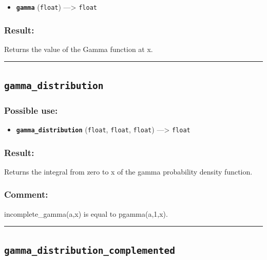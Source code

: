 \documentclass[]{book}
\providecommand{\tightlist}{%
  \setlength{\itemsep}{0pt}\setlength{\parskip}{0pt}}
\theoremstyle{definition}
\theoremstyle{definition}
\theoremstyle{definition}
\theoremstyle{remark}
\begin{document}
\begin{itemize}
\tightlist
\item
  \textbf{\texttt{gamma}} (\texttt{float}) ---\textgreater{}
  \texttt{float}
\end{itemize}

\subsubsection{Result:}\label{result-174}

Returns the value of the Gamma function at x.

\begin{center}\rule{0.5\linewidth}{\linethickness}\end{center}

\subsection{\texorpdfstring{\texttt{gamma\_distribution}}{gamma\_distribution}}\label{gamma_distribution}

\subsubsection{Possible use:}\label{possible-use-181}

\begin{itemize}
\tightlist
\item
  \textbf{\texttt{gamma\_distribution}} (\texttt{float}, \texttt{float},
  \texttt{float}) ---\textgreater{} \texttt{float}
\end{itemize}

\subsubsection{Result:}\label{result-175}

Returns the integral from zero to x of the gamma probability density
function.

\subsubsection{Comment:}\label{comment-39}

incomplete\_gamma(a,x) is equal to pgamma(a,1,x).

\begin{center}\rule{0.5\linewidth}{\linethickness}\end{center}

\subsection{\texorpdfstring{\texttt{gamma\_distribution\_complemented}}{gamma\_distribution\_complemented}}\label{gamma_distribution_complemented}
\end{document}

